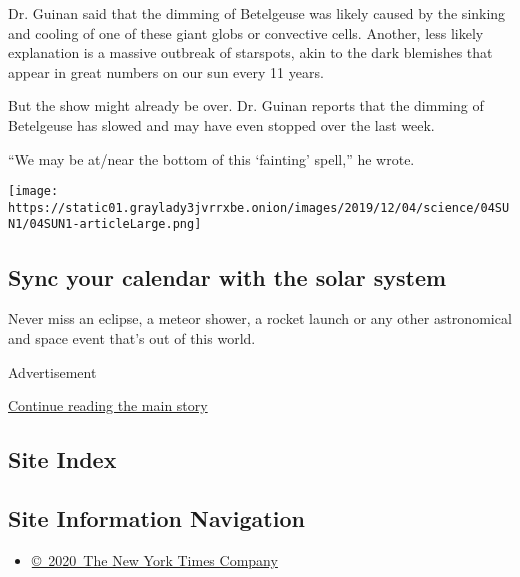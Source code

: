 Dr. Guinan said that the dimming of Betelgeuse was likely caused by the
sinking and cooling of one of these giant globs or convective cells.
Another, less likely explanation is a massive outbreak of starspots,
akin to the dark blemishes that appear in great numbers on our sun every
11 years.

But the show might already be over. Dr. Guinan reports that the dimming
of Betelgeuse has slowed and may have even stopped over the last week.

``We may be at/near the bottom of this `fainting' spell,'' he wrote.

\href{https://www.nytimes3xbfgragh.onion/interactive/2020/science/2020-astronomy-space-calendar.html}{}

\texttt{[image: https://static01.graylady3jvrrxbe.onion/images/2019/12/04/science/04SUN1/04SUN1-articleLarge.png]}

\hypertarget{sync-your-calendar-with-the-solar-system}{%
\subsection{Sync your calendar with the solar
system}\label{sync-your-calendar-with-the-solar-system}}

Never miss an eclipse, a meteor shower, a rocket launch or any other
astronomical and space event that's out of this world.

Advertisement

\protect\hyperlink{after-bottom}{Continue reading the main story}

\hypertarget{site-index}{%
\subsection{Site Index}\label{site-index}}

\hypertarget{site-information-navigation}{%
\subsection{Site Information
Navigation}\label{site-information-navigation}}

\begin{itemize}
\tightlist
\item
  \href{https://help.nytimes3xbfgragh.onion/hc/en-us/articles/115014792127-Copyright-notice}{©~2020~The
  New York Times Company}
\end{itemize}

